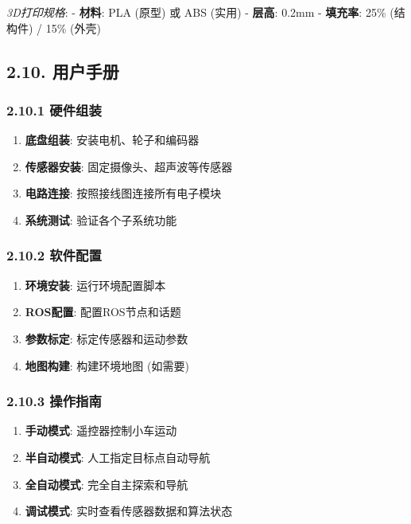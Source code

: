 \emph{3D打印规格}: - \textbf{材料}: PLA (原型) 或 ABS (实用) -
\textbf{层高}: 0.2mm - \textbf{填充率}: 25\% (结构件) / 15\% (外壳)

\subsection{2.10. 用户手册}\label{ux7528ux6237ux624bux518c}

\subsubsection{2.10.1 硬件组装}\label{ux786cux4ef6ux7ec4ux88c5}

\begin{enumerate}
\def\labelenumi{\arabic{enumi}.}
\tightlist
\item
  \textbf{底盘组装}: 安装电机、轮子和编码器
\item
  \textbf{传感器安装}: 固定摄像头、超声波等传感器
\item
  \textbf{电路连接}: 按照接线图连接所有电子模块
\item
  \textbf{系统测试}: 验证各个子系统功能
\end{enumerate}

\subsubsection{2.10.2 软件配置}\label{ux8f6fux4ef6ux914dux7f6e}

\begin{enumerate}
\def\labelenumi{\arabic{enumi}.}
\tightlist
\item
  \textbf{环境安装}: 运行环境配置脚本
\item
  \textbf{ROS配置}: 配置ROS节点和话题
\item
  \textbf{参数标定}: 标定传感器和运动参数
\item
  \textbf{地图构建}: 构建环境地图 (如需要)
\end{enumerate}

\subsubsection{2.10.3 操作指南}\label{ux64cdux4f5cux6307ux5357}

\begin{enumerate}
\def\labelenumi{\arabic{enumi}.}
\tightlist
\item
  \textbf{手动模式}: 遥控器控制小车运动
\item
  \textbf{半自动模式}: 人工指定目标点自动导航
\item
  \textbf{全自动模式}: 完全自主探索和导航
\item
  \textbf{调试模式}: 实时查看传感器数据和算法状态
\end{enumerate}


